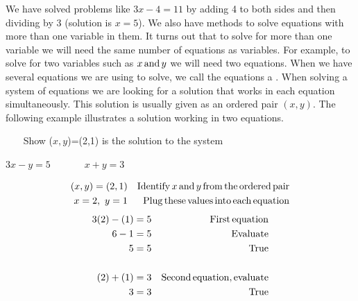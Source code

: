 {}\pp

We have solved problems like $3 x - 4 = 11$ by adding 4 to both sides and then
dividing by 3 (solution is $x = 5$). We also have methods to solve equations
with more than one variable in them. It turns out that to solve for more than
one variable we will need the same number of equations as variables. For
example, to solve for two variables such as $x \operatorname{and} y$ we will need two
equations. When we have several equations we are using to solve, we call the
equations a {}. When solving a system of
equations we are looking for a solution that works in each equation simultaneously. This
solution is usually given as an ordered pair $(x, y)$. The following example
illustrates a solution working in two equations.\pp


\begin{example}~~~
  Show ($x,y$)=(2,1) is the solution to the system
\begin{center}
   $ 3 x - y = 5$~~~~~~~$x + y = 3$
\end{center}
	\begin{eqnarray*}
    (x,y)=(2, 1) &  & \tmop{Identify} x \tmop{and} y \tmop{from} \tmop{the}
    \tmop{ordered} \tmop{pair}\\
    x = 2,~y = 1 &  & \tmop{Plug} \tmop{these} \tmop{values} \tmop{into}
    \tmop{each} \tmop{equation}%
	\end{eqnarray*}
	\begin{eqnarray*}
    3 (2) - (1) = 5 &  & \operatorname{First} \operatorname{equation}\\
    6 - 1 = 5 &  & \operatorname{Evaluate}\\
    5 = 5 &  & \operatorname{True}\\
    &  & \\
    (2) + (1) = 3 &  & \operatorname{Second} \operatorname{equation}, \operatorname{evaluate}\\
    3 = 3 &  & \operatorname{True}
  \end{eqnarray*}
\end{example}

